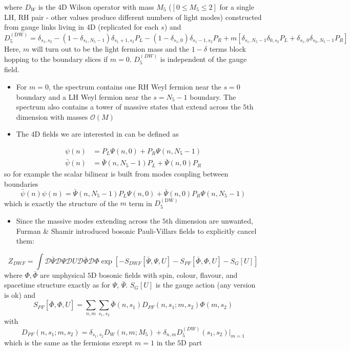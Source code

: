 where $D_W$ is the $4$D Wilson operator with mass $M_5$ ($[0 \leq M_5 \leq 2]$ for a single LH, RH pair - other values produce different numbers of light modes) constructed from gauge links living in $4$D (replicated for each $s$) and
\begin{equation}
    D_5^{(\text{DW})} = \delta_{s_1, s_2} - (1-\delta_{s_1, N_5 - 1})\delta_{s_1 + 1,s_2}P_L - (1 - \delta_{s_1, 0})\delta_{s_1-1, s_2}P_R + m[\delta_{s_1, N_5 - 1}\delta_{0, s_2}P_L + \delta_{s_1, 0}\delta_{s_2, N_5 - 1}P_R]
\end{equation}
Here, $m$ will turn out to be the light fermion mass and the $1-\delta$ terms block hopping to the boundary slices if $m=0$. $D_5^{(DW)}$ is independent of the gauge field.
\begin{itemize}
    \item For $m=0$, the spectrum contains one RH Weyl fermion near the $s=0$ boundary and a LH Weyl fermion near the $s = N_5 - 1$ boundary. The spectrum also contains a tower of massive states that extend across the $5$th dimension with masses $\mathcal{O}(M)$
    \item The $4$D fields we are interested in can be defined as
\end{itemize}
\begin{align}
    \psi(n) &= P_L \Psi(n,0) + P_R \Psi(n, N_5 - 1) \nonumber \\
    \bar{\psi}(n) &= \bar{\Psi}(n,N_5 - 1) P_L + \bar{\Psi}(n,0)P_R
\end{align}
so for example the scalar bilinear is built from modes coupling between boundaries
\begin{equation}
    \bar{\psi}(n)\psi(n) = \bar{\Psi}(n,N_5 - 1) P_L \Psi(n,0) + \bar{\Psi}(n,0)P_R \Psi(n, N_5-1)
\end{equation}
which is exactly the structure of the \(m\) term in \(D_{5}^{(\text{DW})}\)

\begin{itemize}
  \item Since the massive modes extending across the $5$th dimension are unwanted, Furman \& Shamir introduced bosonic Pauli-Villars fields to explicitly cancel them:
\end{itemize}
\begin{equation}
    Z_{DWF} = \int \mathcal{D}\bar{\Psi}\mathcal{D}\Psi\mathcal{D}U\mathcal{D}\bar{\Phi}\mathcal{D}\Phi \exp[-S_{DWF}[\bar{\Psi},\Psi,U]-S_{PF}[\bar{\Phi}, \Phi, U] - S_G[U]]
\end{equation}
where $\Phi, \bar{\Phi}$ are unphysical $5$D bosonic fields with spin, colour, flavour, and spacetime structure exactly as for $\Psi$, $\bar{\Psi}$. $S_G[U]$ is the gauge action (any version is ok) and
\begin{equation}
    S_{PF}[\bar \Phi, {\Phi}, U] = \sum_{n,m}\sum_{s_1, s_2}\bar{\Phi}(n,s_1)D_{PF}(n,s_1;m,s_2)\Phi(m,s_2)
\end{equation}
with
\begin{equation}
    D_{PF}(n,s_1;m,s_2) = \delta_{s_1, s_2}D_W(n,m;M_5) + \delta_{n,m}D_5^{(DW)}(s_1,s_2)|_{m = 1}
\end{equation}
which is the same as the fermions except $m=1$ in the $5$D part

